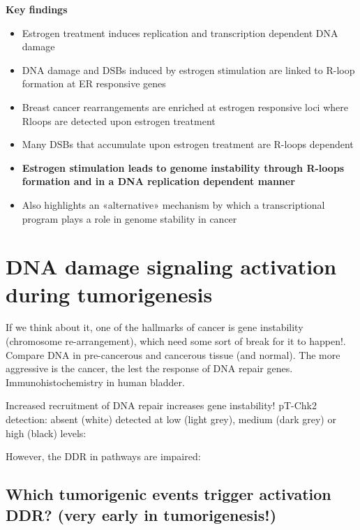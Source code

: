 \textbf{Key findings}
\begin{itemize}
\tightlist
\item Estrogen treatment induces replication and transcription
dependent DNA damage
\item DNA damage and DSBs induced by estrogen
stimulation are linked to R-loop formation at ER responsive genes
\item Breast cancer rearrangements are enriched at estrogen responsive loci
where Rloops are detected upon estrogen treatment 
\item Many DSBs that
accumulate upon estrogen treatment are R-loops dependent 
\item \textbf{Estrogen stimulation leads to genome instability through R-loops
formation and in a DNA replication dependent manner} 
\item Also highlights
an «alternative» mechanism by which a transcriptional program plays a
role in genome stability in cancer
\end{itemize} 


\hypertarget{dna-damage-signaling-activation-during-tumorigenesis}{%
\section{DNA damage signaling activation during
tumorigenesis}\label{dna-damage-signaling-activation-during-tumorigenesis}}

If we think about it, one of the hallmarks of cancer is gene instability
(chromosome re-arrangement), which need some sort of break for it to
happen!. Compare DNA in pre-cancerous and cancerous tissue (and normal).
The more aggressive is the cancer, the lest the response of DNA repair
genes. Immunohistochemistry in human bladder.

Increased recruitment of DNA repair increases gene instability! pT-Chk2
detection: absent (white) detected at low (light grey), medium (dark
grey) or high (black) levels:

However, the DDR in pathways are impaired:

\hypertarget{which-tumorigenic-events-trigger-activation-ddr-very-early-in-tumorigenesis}{%
\subsection{Which tumorigenic events trigger activation DDR? (very early
in
tumorigenesis!)}\label{which-tumorigenic-events-trigger-activation-ddr-very-early-in-tumorigenesis}}

